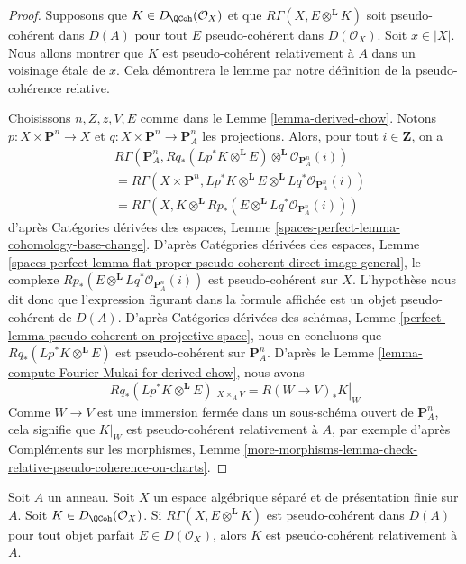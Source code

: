 \begin{proof}
Supposons que $K \in D_\QCoh(\mathcal{O}_X)$ et que
$R\Gamma(X, E \otimes^\mathbf{L} K)$ soit pseudo-cohérent
dans $D(A)$ pour tout $E$ pseudo-cohérent dans $D(\mathcal{O}_X)$.
Soit $x \in |X|$. Nous allons montrer que $K$ est pseudo-cohérent relativement à $A$
dans un voisinage \'etale de $x$. Cela démontrera le lemme
par notre définition de la pseudo-cohérence relative.

\medskip\noindent
Choisissons $n, Z, z, V, E$ comme dans le Lemme \ref{lemma-derived-chow}.
Notons $p : X \times \mathbf{P}^n \to X$ et
$q : X \times \mathbf{P}^n \to \mathbf{P}^n_A$
les projections.
Alors, pour tout $i \in \mathbf{Z}$, on a
\begin{align*}
& R\Gamma(\mathbf{P}^n_A,
Rq_*(Lp^*K \otimes^\mathbf{L} E)
\otimes^\mathbf{L}
\mathcal{O}_{\mathbf{P}^n_A}(i)) \\
& =
R\Gamma(X \times \mathbf{P}^n,
Lp^*K \otimes^\mathbf{L} E \otimes^\mathbf{L}
Lq^*\mathcal{O}_{\mathbf{P}^n_A}(i)) \\
& =
R\Gamma(X,
K \otimes^\mathbf{L} Rp_*(E \otimes^\mathbf{L}
Lq^*\mathcal{O}_{\mathbf{P}^n_A}(i)))
\end{align*}
d'après
Catégories dérivées des espaces,
Lemme \ref{spaces-perfect-lemma-cohomology-base-change}.
D'après
Catégories dérivées des espaces, Lemme
\ref{spaces-perfect-lemma-flat-proper-pseudo-coherent-direct-image-general},
le complexe $Rp_*(E \otimes^\mathbf{L} Lq^*\mathcal{O}_{\mathbf{P}^n_A}(i))$
est pseudo-cohérent sur $X$. L'hypothèse nous dit donc que l'expression
figurant dans la formule affichée est un objet pseudo-cohérent de $D(A)$.
D'après
Catégories dérivées des schémas,
Lemme \ref{perfect-lemma-pseudo-coherent-on-projective-space},
nous en concluons que $Rq_*(Lp^*K \otimes^\mathbf{L} E)$ est
pseudo-cohérent sur $\mathbf{P}^n_A$.
D'après le Lemme \ref{lemma-compute-Fourier-Mukai-for-derived-chow},
nous avons
$$
Rq_*(Lp^*K \otimes^\mathbf{L} E)|_{X \times_A V} =
R(W \to V)_*K|_W
$$
Comme $W \to V$ est une immersion fermée dans un sous-schéma ouvert de
$\mathbf{P}^n_A$, cela signifie que $K|_W$ est pseudo-cohérent relativement à $A$,
par exemple d'après
Compléments sur les morphismes,
Lemme \ref{more-morphisms-lemma-check-relative-pseudo-coherence-on-charts}.
\end{proof}

\begin{lemma}
\label{lemma-characterize-pseudo-coh-improved}
Soit $A$ un anneau. Soit $X$ un espace algébrique séparé et
de présentation finie sur $A$. Soit $K \in D_\QCoh(\mathcal{O}_X)$. Si
$R \Gamma (X, E \otimes ^{\mathbf{L}} K)$ est
pseudo-cohérent dans $D(A)$ pour tout objet parfait
$E \in D(\mathcal{O}_X)$, alors $K$ est pseudo-cohérent
relativement à $A$.
\end{lemma}

